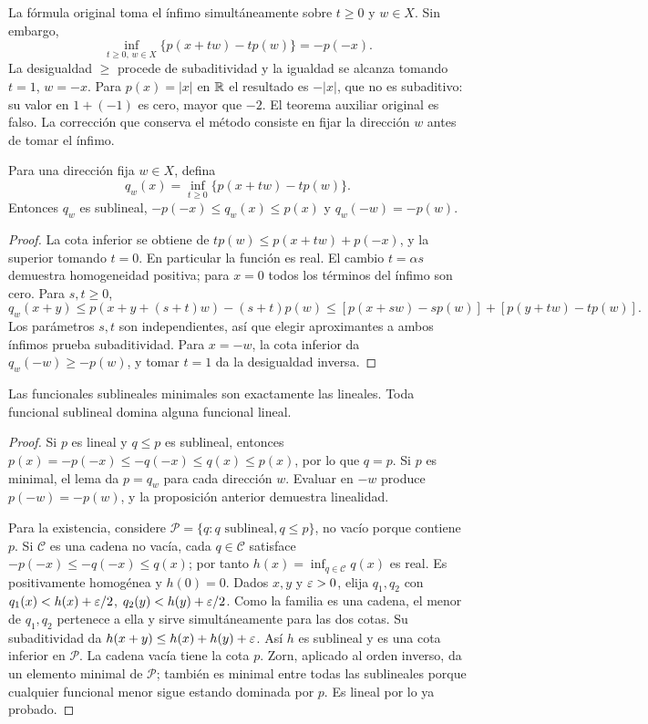 \begin{observacion}
La fórmula original toma el ínfimo simultáneamente sobre $t\geq0$ y $w\in X$. Sin embargo,
\[
 \inf_{t\geq0,\,w\in X}\{p(x+tw)-tp(w)\}=-p(-x).
\]
La desigualdad $\geq$ procede de subaditividad y la igualdad se alcanza tomando $t=1$, $w=-x$. Para $p(x)=|x|$ en $\mathbb R$ el resultado es $-|x|$, que no es subaditivo: su valor en $1+(-1)$ es cero, mayor que $-2$. El teorema auxiliar original es falso. La corrección que conserva el método consiste en fijar la dirección $w$ antes de tomar el ínfimo.
\end{observacion}
\begin{lema}\label{v3:auxiliar-fija}
Para una dirección fija $w\in X$, defina
\[
 q_w(x)=\inf_{t\geq0}\{p(x+tw)-tp(w)\}.
\]
Entonces $q_w$ es sublineal, $-p(-x)\leq q_w(x)\leq p(x)$ y $q_w(-w)=-p(w)$.
\end{lema}
\begin{proof}
La cota inferior se obtiene de $tp(w)\leq p(x+tw)+p(-x)$, y la superior tomando $t=0$. En particular la función es real. El cambio $t=\alpha s$ demuestra homogeneidad positiva; para $x=0$ todos los términos del ínfimo son cero. Para $s,t\geq0$,
\[
 q_w(x+y)\leq p(x+y+(s+t)w)-(s+t)p(w)
 \leq[p(x+sw)-sp(w)]+[p(y+tw)-tp(w)].
\]
Los parámetros $s,t$ son independientes, así que elegir aproximantes a ambos ínfimos prueba subaditividad. Para $x=-w$, la cota inferior da $q_w(-w)\geq-p(w)$, y tomar $t=1$ da la desigualdad inversa.
\end{proof}
\begin{teorema}\label{v3:minimales}
Las funcionales sublineales minimales son exactamente las lineales. Toda funcional sublineal domina alguna funcional lineal.
\end{teorema}
\begin{proof}
Si $p$ es lineal y $q\leq p$ es sublineal, entonces $p(x)=-p(-x)\leq-q(-x)\leq q(x)\leq p(x)$, por lo que $q=p$. Si $p$ es minimal, el lema da $p=q_w$ para cada dirección $w$. Evaluar en $-w$ produce $p(-w)=-p(w)$, y la proposición anterior demuestra linealidad.

Para la existencia, considere $\mathcal P=\{q:q\text{ sublineal},q\leq p\}$, no vacío porque contiene $p$. Si $\mathcal C$ es una cadena no vacía, cada $q\in\mathcal C$ satisface $-p(-x)\leq-q(-x)\leq q(x)$; por tanto $h(x)=\inf_{q\in\mathcal C}q(x)$ es real. Es positivamente homogénea y $h(0)=0$. Dados $x,y$ y $\varepsilon>0$, elija $q_1,q_2$ con $q_1(x)<h(x)+\varepsilon/2$, $q_2(y)<h(y)+\varepsilon/2$. Como la familia es una cadena, el menor de $q_1,q_2$ pertenece a ella y sirve simultáneamente para las dos cotas. Su subaditividad da $h(x+y)\leq h(x)+h(y)+\varepsilon$. Así $h$ es sublineal y es una cota inferior en $\mathcal P$. La cadena vacía tiene la cota $p$. Zorn, aplicado al orden inverso, da un elemento minimal de $\mathcal P$; también es minimal entre todas las sublineales porque cualquier funcional menor sigue estando dominada por $p$. Es lineal por lo ya probado.
\end{proof}


